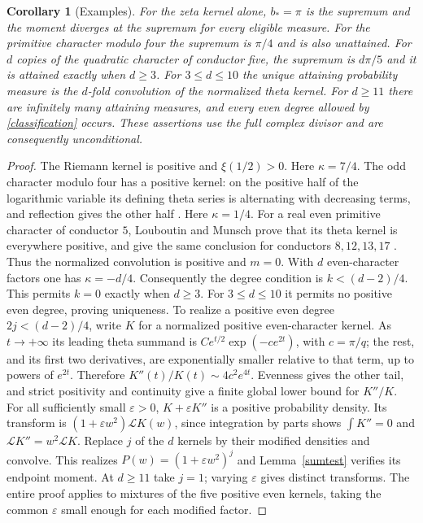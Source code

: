 \documentclass[11pt]{article}
\newtheorem{corollary}[theorem]{Corollary}
\begin{document}
\begin{corollary}[Examples]\label{examples}
For the zeta kernel alone, $b_*=\pi$ is the supremum and the moment diverges at the supremum for every eligible measure. For the primitive character modulo four the supremum is $\pi/4$ and is also unattained. For $d$ copies of the quadratic character of conductor five, the supremum is $d\pi/5$ and it is attained exactly when $d\ge3$. For $3\le d\le10$ the unique attaining probability measure is the $d$-fold convolution of the normalized theta kernel. For $d\ge11$ there are infinitely many attaining measures, and every even degree allowed by \eqref{classification} occurs. These assertions use the full complex divisor and are consequently unconditional.
\end{corollary}
\begin{proof}
The Riemann kernel is positive \cite{bpy} and $\xi(1/2)>0$. Here $\kappa=7/4$. The odd character modulo four has a positive kernel: on the positive half of the logarithmic variable its defining theta series is alternating with decreasing terms, and reflection gives the other half \cite{repo}. Here $\kappa=1/4$. For a real even primitive character of conductor $5$, Louboutin and Munsch prove that its theta kernel is everywhere positive, and give the same conclusion for conductors $8,12,13,17$ \cite{lm}. Thus the normalized convolution is positive and $m=0$. With $d$ even-character factors one has $\kappa=-d/4$. Consequently the degree condition is $k<(d-2)/4$. This permits $k=0$ exactly when $d\ge3$. For $3\le d\le 10$ it permits no positive even degree, proving uniqueness. To realize a positive even degree $2j<(d-2)/4$, write $K$ for a normalized positive even-character kernel. As $t\to+\infty$ its leading theta summand is $C e^{t/2}\exp(-c e^{2t})$, with $c=\pi/q$; the rest, and its first two derivatives, are exponentially smaller relative to that term, up to powers of $e^{2t}$. Therefore $K''(t)/K(t)\sim 4c^2 e^{4t}$. Evenness gives the other tail, and strict positivity and continuity give a finite global lower bound for $K''/K$. For all sufficiently small $\varepsilon>0$, $K+\varepsilon K''$ is a positive probability density. Its transform is $(1+\varepsilon w^2)\mathcal LK(w)$, since integration by parts shows $\int K''=0$ and $\mathcal L K''=w^2\mathcal L K$. Replace $j$ of the $d$ kernels by their modified densities and convolve. This realizes $P(w)=(1+\varepsilon w^2)^j$ and Lemma~\ref{sumtest} verifies its endpoint moment. At $d\ge11$ take $j=1$; varying $\varepsilon$ gives distinct transforms. The entire proof applies to mixtures of the five positive even kernels, taking the common $\varepsilon$ small enough for each modified factor.
\end{proof}
\end{document}
